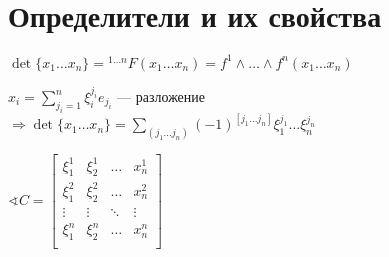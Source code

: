 \section{Определители и их свойства}

\begin{definition}
    \(\det\{x_1\ldots x_n\}={}^{1\ldots n}F(x_1\ldots x_n)=f^1\wedge\ldots\wedge f^n(x_1\ldots x_n)\)
\end{definition}

\(x_i=\sum\limits_{j_i=1}^n\xi_i^{j_i}e_{j_i}\) --- разложение \(\Rightarrow \det\{x_1\ldots x_n\}=\sum\limits_{(j_1\ldots j_n)}(-1)^{[j_1\ldots j_n]} \xi_1^{j_1}\ldots \xi_n^{j_n}\)

\(\sphericalangle C=\begin{bmatrix}
    \xi_1^1 & \xi_2^1 & \ldots & x_n^1  \\
    \xi_1^2 & \xi_2^2 & \ldots & x_n^2  \\
    \vdots  & \vdots  & \ddots & \vdots \\
    \xi_1^n & \xi_2^n & \ldots & x_n^n  \\
\end{bmatrix}\)



